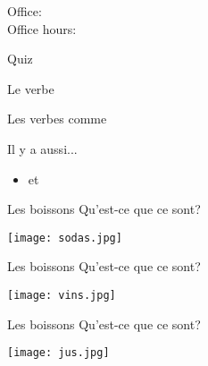 \documentclass{beamer}
\subtitle[Boissons et verbes]{Les boissons et plus de verbes}
\begin{document}
  \begin{frame}
    \titlepage
    \tiny{Office: \\
          Office hours: }
  \end{frame}

  \begin{frame}{}
    \begin{center}
      \Large Quiz
    \end{center}
  \end{frame}

  \begin{frame}{Le verbe }
    \begin{center}
      
    \end{center}
  \end{frame}

  \begin{frame}{Les verbes comme }
    \begin{center}
      
    \end{center}
    Il y a aussi...
    \begin{itemize}
      \item {} et 
    \end{itemize}
  \end{frame}

  \begin{frame}{Les boissons}
    Qu'est-ce que ce sont? \underline{}
    \begin{center}
      \texttt{[image: sodas.jpg]}
    \end{center}
  \end{frame}

  \begin{frame}{Les boissons}
    Qu'est-ce que ce sont? \\
    \underline{}
    \begin{center}
      \texttt{[image: vins.jpg]}
    \end{center}
  \end{frame}

  \begin{frame}{Les boissons}
    Qu'est-ce que ce sont? \\
    \underline{}
    \begin{center}
      \texttt{[image: jus.jpg]}
    \end{center}
  \end{frame}
\end{document}
